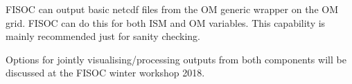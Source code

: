 \documentclass[12pt]{article}
\begin{document}
FISOC can output basic netcdf files from the OM generic wrapper 
on the OM grid. 
FISOC can do this for both ISM and OM variables.
This capability is mainly recommended just for sanity checking.

Options for jointly visualising/processing outputs from both components 
will be discussed at the FISOC winter workshop 2018.








\end{document}

